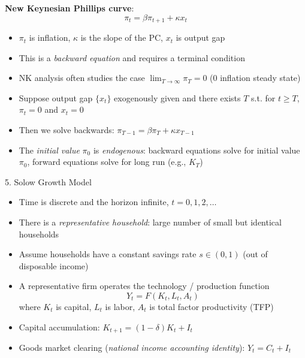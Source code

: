 \documentclass[10pt]{beamer}
\begin{document}
\begin{frame}{}
\textbf{New Keynesian Phillips curve}:
\begin{equation*}
	\pi_t = \beta \pi_{t+1} + \kappa x_t
\end{equation*}
\begin{itemize}
	\item $\pi_t$ is inflation, $\kappa$ is the slope of the PC, $x_t$ is output gap
	
	\item This is a \textit{backward equation} and requires a terminal condition
	
	\item NK analysis often studies the case $\lim_{T \to \infty} \pi_T = 0$ ($0$ inflation steady state)
	
	\item Suppose output gap $\{ x_t \}$ exogenously given and there exists $T$ s.t. for $t \geq T$, $\pi_t = 0$ and $x_t = 0$
	
	\item Then we solve backwards: $\pi_{T-1} = \beta \pi_T + \kappa x_{T-1}$
	
	\item The \textit{initial value} $\pi_0$ is \textit{endogenous}: backward equations solve for initial value $\pi_0$, forward equations solve for long run (e.g., $K_T$)
\end{itemize}
\end{frame}



\begin{frame}{5. Solow Growth Model}
\begin{itemize}
\item Time is discrete and the horizon infinite, $t = 0, 1, 2, \ldots$

\item There is a \textit{representative household}: large number of small but identical households

\item Assume households have a constant savings rate $s \in (0, 1)$ (out of disposable income)

\item A representative firm operates the technology / production function
\begin{equation*}
	Y_t = F(K_t, L_t, A_t)
\end{equation*}
where $K_t$ is capital, $L_t$ is labor, $A_t$ is total factor productivity (TFP)

\item Capital accumulation: $K_{t+1} = (1-\delta) K_t + I_t$

\item Goods market clearing (\textit{national income accounting identity}): $Y_t = C_t + I_t$
\end{itemize}
\end{frame}
\end{document}
